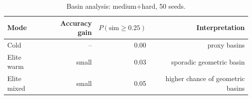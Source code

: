 \begin{table}[h]
\centering
\caption{Basin analysis: medium+hard, 50 seeds.}
\begin{tabular}{l r r r}
\hline
Mode & Accuracy gain & \(P(\mathrm{sim}\ge 0.25)\) & Interpretation \\
\hline
Cold & -- & 0.00 & proxy basins \\
Elite warm & small & 0.03 & sporadic geometric basin \\
Elite mixed & small & 0.05 & higher chance of geometric basins \\
\hline
\end{tabular}
\end{table}
